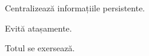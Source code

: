 \documentclass{beamer}
\begin{document}
\begin{frame}{}
  \LARGE
  \begin{center}
    Centralizează informațiile persistente.
  \end{center}
\end{frame}

\begin{frame}{}
  \LARGE
  \begin{center}
    Evită atașamente.
  \end{center}
\end{frame}

\begin{frame}{}
  \LARGE
  \begin{center}
    Totul se exersează.
  \end{center}
\end{frame}

\frame{\titlepage}
\end{document}
